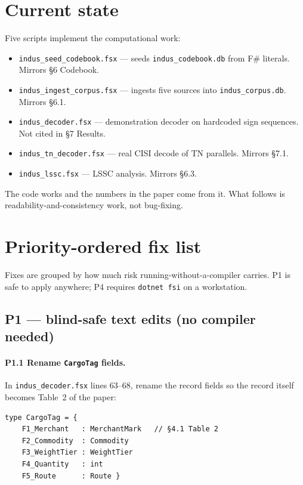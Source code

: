 \documentclass[11pt]{article}
\begin{document}
\section{Current state}

Five scripts implement the computational work:

\begin{itemize}[leftmargin=2em]
\item \texttt{indus\_seed\_codebook.fsx} --- seeds
  \texttt{indus\_codebook.db} from F\# literals.
  Mirrors \S6 Codebook.
\item \texttt{indus\_ingest\_corpus.fsx} --- ingests five sources
  into \texttt{indus\_corpus.db}.
  Mirrors \S6.1.
\item \texttt{indus\_decoder.fsx} --- demonstration decoder on
  hardcoded sign sequences.
  Not cited in \S7 Results.
\item \texttt{indus\_tn\_decoder.fsx} --- real CISI decode of TN
  parallels.
  Mirrors \S7.1.
\item \texttt{indus\_lssc.fsx} --- LSSC analysis.
  Mirrors \S6.3.
\end{itemize}

The code works and the numbers in the paper come from it.
What follows is readability-and-consistency work, not
bug-fixing.

\section{Priority-ordered fix list}

Fixes are grouped by how much risk running-without-a-compiler
carries.  P1 is safe to apply anywhere; P4 requires
\texttt{dotnet fsi} on a workstation.

\subsection{P1 --- blind-safe text edits (no compiler needed)}

\paragraph{P1.1 Rename \texttt{CargoTag} fields.}
In \texttt{indus\_decoder.fsx} lines 63--68, rename the record
fields so the record itself becomes Table~2 of the paper:

\begin{Verbatim}[fontsize=\small,frame=single]
type CargoTag = {
    F1_Merchant   : MerchantMark   // §4.1 Table 2
    F2_Commodity  : Commodity
    F3_WeightTier : WeightTier
    F4_Quantity   : int
    F5_Route      : Route }
\end{Verbatim}
\end{document}
